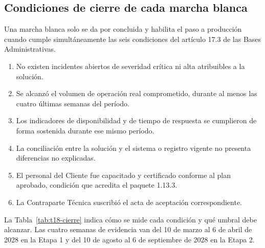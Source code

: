 \documentclass[11pt]{article}
\begin{document}
\subsection*{Condiciones de cierre de cada marcha blanca}

Una marcha blanca solo se da por concluida y habilita el paso a producción cuando cumple simultáneamente las seis condiciones del artículo 17.3 de las Bases Administrativas.

\begin{enumerate}
\item No existen incidentes abiertos de severidad crítica ni alta atribuibles a la solución.
\item Se alcanzó el volumen de operación real comprometido, durante al menos las cuatro últimas semanas del período.
\item Los indicadores de disponibilidad y de tiempo de respuesta se cumplieron de forma sostenida durante ese mismo período.
\item La conciliación entre la solución y el sistema o registro vigente no presenta diferencias no explicadas.
\item El personal del Cliente fue capacitado y certificado conforme al plan aprobado, condición que acredita el paquete 1.13.3.
\item La Contraparte Técnica suscribió el acta de aceptación correspondiente.
\end{enumerate}

La Tabla~\ref{tab:t18-cierre} indica cómo se mide cada condición y qué umbral debe alcanzar. Las cuatro semanas de evidencia van del 10 de marzo al 6 de abril de 2028 en la Etapa 1 y del 10 de agosto al 6 de septiembre de 2028 en la Etapa 2.
\end{document}
